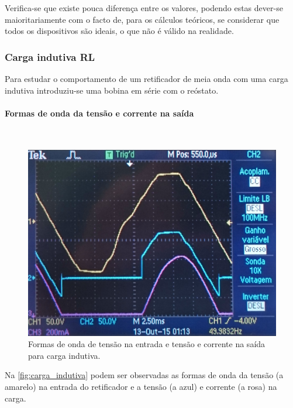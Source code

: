 \documentclass[a4paper,11pt]{article}
\numberwithin{equation}{section}
\begin{document}

Verifica-se que existe pouca diferença entre os valores, podendo estas dever-se maioritariamente com o facto de, para os cálculos teóricos, se considerar que todos os dispositivos são ideais, o que não é válido na realidade.

\subsubsection{Carga indutiva RL}

Para estudar o comportamento de um retificador de meia onda com uma carga indutiva introduziu-se uma bobina em série com o reóstato.

\paragraph{Formas de onda da tensão e corrente na saída}\mbox{}\

\begin{figure}[h]
	\centering
	\includegraphics[keepaspectratio=true, scale=0.13]{img/figs/carga_indutiva}
	\caption{Formas de onda de tensão na entrada e tensão e corrente na saída para carga indutiva.}
	\label{fig:carga_indutiva}
	\vspace{-0.8em}
\end{figure}

Na \autoref{fig:carga_indutiva} podem ser observadas as formas de onda da tensão (a amarelo) na entrada do retificador e a tensão (a azul) e corrente (a rosa) na carga.
\end{document}
